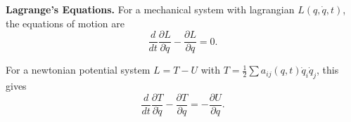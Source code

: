 \textbf{Lagrange's Equations.} For a mechanical system with lagrangian $L(q, \dot{q}, t)$, the equations of motion are
$$\frac{d}{dt}\frac{\partial L}{\partial \dot{q}} - \frac{\partial L}{\partial q} = 0.$$

For a newtonian potential system $L = T - U$ with $T = \frac{1}{2}\sum a_{ij}(q,t)\dot{q}_i\dot{q}_j$, this gives
$$\frac{d}{dt}\frac{\partial T}{\partial \dot{q}} - \frac{\partial T}{\partial q} = -\frac{\partial U}{\partial q}.$$
